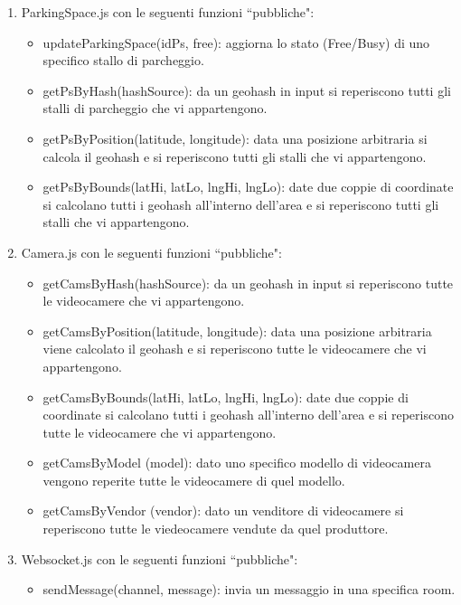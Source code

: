 \begin{enumerate}
	\item ParkingSpace.js con le seguenti funzioni ``pubbliche":
	\begin{itemize}
			\item updateParkingSpace(idPs, free): aggiorna lo stato (Free/Busy) di uno specifico stallo di parcheggio.
			\item getPsByHash(hashSource): da un geohash in input si reperiscono tutti gli stalli di parcheggio che vi appartengono.
			\item getPsByPosition(latitude, longitude): data una posizione arbitraria si calcola il geohash e si reperiscono tutti gli stalli che vi appartengono.
			\item getPsByBounds(latHi, latLo, lngHi, lngLo): date due coppie di coordinate si calcolano tutti i geohash all'interno dell'area e si reperiscono tutti gli stalli che vi appartengono.
		\end{itemize}

	\item Camera.js con le seguenti funzioni ``pubbliche":
	\begin{itemize}
			\item getCamsByHash(hashSource): da un geohash in input si reperiscono tutte le videocamere che vi appartengono.
			\item getCamsByPosition(latitude, longitude): data una posizione arbitraria viene calcolato il geohash e si reperiscono tutte le videocamere che vi appartengono.
			\item getCamsByBounds(latHi, latLo, lngHi, lngLo): date due coppie di coordinate si calcolano tutti i geohash all'interno dell'area e si reperiscono tutte le videocamere che vi appartengono.
			\item getCamsByModel (model): dato uno specifico modello di videocamera vengono reperite tutte le videocamere di quel modello.
			\item getCamsByVendor (vendor): dato un venditore di videocamere si reperiscono tutte le viedeocamere vendute da quel produttore.
	\end{itemize}

	\item Websocket.js con le seguenti funzioni ``pubbliche":
	\begin{itemize}
		\item sendMessage(channel, message): invia un messaggio in una specifica room.
	\end{itemize}
\end{enumerate}


